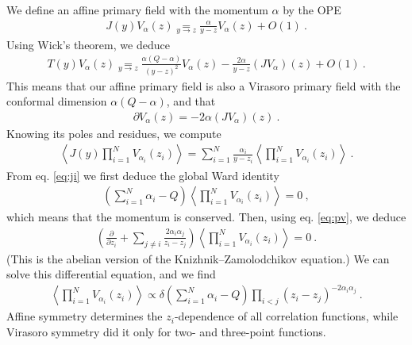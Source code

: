 \documentclass[12pt, a4paper]{article}
\theoremstyle{break}
\begin{document}
We define an affine primary field with the momentum $\alpha$ by the OPE 
\begin{align}
 J(y) V_\alpha(z) \underset{y\to z}{=} \frac{\alpha}{y-z} V_\alpha(z) + O(1)\ .
\label{jva}
\end{align}
Using Wick's theorem, we deduce 
\begin{align}
 T(y) V_\alpha(z) \underset{y\to z}{=} \frac{\alpha(Q-\alpha) }{(y-z)^2}V_\alpha(z) - \frac{2\alpha}{y-z} (JV_\alpha)(z) + O(1)\ . 
\end{align}
This means that our affine primary field is also a Virasoro primary field with the conformal dimension $\alpha(Q-\alpha)$, and that 
\begin{align}
 \partial V_\alpha(z) = -2\alpha (JV_\alpha)(z)\ .
 \label{eq:pv}
\end{align}
Knowing its poles and residues, we compute 
\begin{align}
 \left< J(y) \prod_{i=1}^N V_{\alpha_i}(z_i)\right> = \sum_{i=1}^N\frac{\alpha_i}{y-z_i} \left<\prod_{i=1}^N V_{\alpha_i}(z_i)\right>\ .
\end{align}
From eq. \eqref{eq:ji} we first deduce the global Ward identity 
\begin{align}
 \left(\textstyle\sum_{i=1}^N \alpha_i - Q\right) \left\langle \prod_{i=1}^N V_{\alpha_i}(z_i) \right\rangle = 0 \ ,
\end{align}
which means that the momentum is conserved. Then, using eq. \eqref{eq:pv}, we deduce 
\begin{align}
\left( {\frac{\partial}{\partial z_i}} +\sum_{j\neq i} \frac{2\alpha_i\alpha_j}{z_i-z_j} \right) \left\langle \prod_{i=1}^N V_{\alpha_i}(z_i) \right\rangle = 0 \ .
\label{kzl}
\end{align}
(This is the abelian version of the Knizhnik--Zamolodchikov equation.) 
We can solve this differential equation, and we find
\begin{align}
 \left\langle \prod_{i=1}^N V_{\alpha_i}(z_i) \right\rangle \propto \delta\left(\textstyle\sum_{i=1}^N \alpha_i - Q\right) \prod_{i<j} (z_i-z_j)^{-2\alpha_i\alpha_j}\ .
\end{align}
Affine symmetry determines the $z_i$-dependence of all correlation functions, while Virasoro symmetry did it only for two- and three-point functions. 
\end{document}

